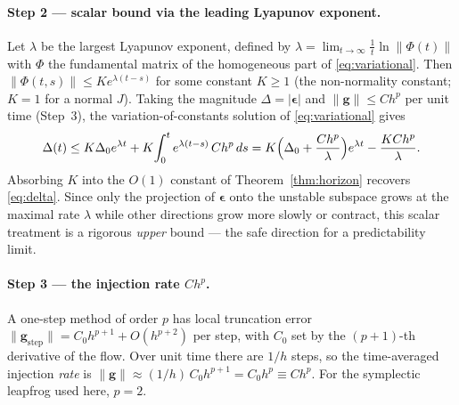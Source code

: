\documentclass[11pt]{article}
\theoremstyle{definition}
\begin{document}
\paragraph{Step 2 --- scalar bound via the leading Lyapunov exponent.}
Let $\lambda$ be the largest Lyapunov exponent, defined by
$\lambda = \lim_{t\to\infty}\frac1t\ln\|\Phi(t)\|$ with $\Phi$ the fundamental
matrix of the homogeneous part of \eqref{eq:variational}. Then
$\|\Phi(t,s)\| \le K e^{\lambda(t-s)}$ for some constant $K\ge 1$ (the
non-normality constant; $K=1$ for a normal $J$). Taking the magnitude
$\Delta = |\boldsymbol\epsilon|$ and $\|\mathbf g\| \le C h^{p}$ per unit time
(Step~3), the variation-of-constants solution of \eqref{eq:variational} gives
\begin{equation}
\Delta(t) \le K\Delta_0 e^{\lambda t}
+ K\!\int_0^t e^{\lambda(t-s)}\,C h^{p}\,ds
= K\Bigl(\Delta_0 + \frac{C h^{p}}{\lambda}\Bigr)e^{\lambda t}
- \frac{KC h^{p}}{\lambda}.
\end{equation}
Absorbing $K$ into the $O(1)$ constant of Theorem~\ref{thm:horizon} recovers
\eqref{eq:delta}. Since only the projection of $\boldsymbol\epsilon$ onto the
unstable subspace grows at the maximal rate $\lambda$ while other directions
grow more slowly or contract, this scalar treatment is a rigorous
\emph{upper} bound --- the safe direction for a predictability limit.

\paragraph{Step 3 --- the injection rate $Ch^{p}$.}
A one-step method of order $p$ has local truncation error
$\|\mathbf g_{\mathrm{step}}\| = C_0 h^{p+1} + O(h^{p+2})$ per step, with $C_0$
set by the $(p+1)$-th derivative of the flow. Over unit time there are $1/h$
steps, so the time-averaged injection \emph{rate} is
$\|\mathbf g\| \approx (1/h)\,C_0 h^{p+1} = C_0 h^{p} \equiv C h^{p}$. For the
symplectic leapfrog used here, $p=2$.
\end{document}
